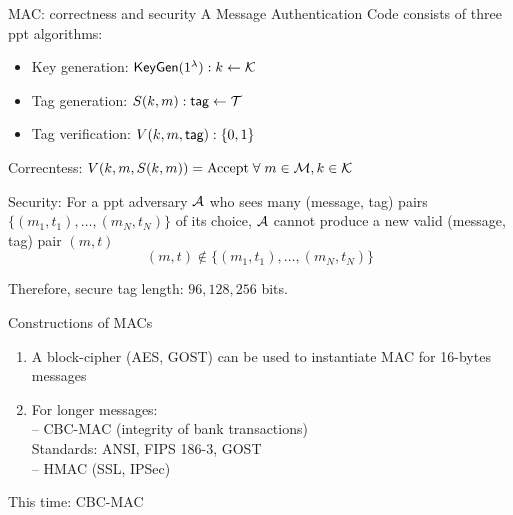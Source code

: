 \documentclass[usenames,dvipsnames, 9pt]{beamer}
\begin{document}
\begin{frame}{MAC: correctness and security}
\Large
A {\color{Orange} Message Authentication Code } consists of three ppt algorithms:
\vspace{-5pt}
\begin{itemize}
	\item Key generation: $\textsf{KeyGen}(1^\lambda): k \leftarrow \mathcal{K}$ \\[4pt]
	\item Tag generation: $S(k, m): \textsf{tag} \leftarrow \mathcal{T}$ \\[4pt]
	\item Tag verification: $V(k, m, \textsf{tag}): \{0, 1\}  $  \\
\end{itemize}

\pause
\vspace{10pt}
{\color{Orange}Correcntess:} \LARGE 
$ V(k, m, S(k,m)) = \text{Accept} \; \forall \; m \in \mathcal{M}, k \in \mathcal{K} $

\vspace{10pt}
{\color{Orange}Security:}
For a ppt adversary $\mathcal{A}$ who sees many (message, tag) pairs $\{(m_1, t_1), \ldots, (m_N, t_N) \}$ of its choice, $\mathcal{A}$ cannot produce a new valid (message, tag) pair $(m,t)$
\[(m,t) \notin \{(m_1, t_1), \ldots, (m_N, t_N) \}\]

\vspace{10pt}

Therefore, secure tag length: $96, 128, 256 $ bits.
\end{frame}

\begin{frame}{Constructions of MACs}
\Large
\begin{enumerate}
	\itemsep1em
	\item A block-cipher  (AES, GOST) can be used to instantiate MAC for 16-bytes messages
	\item For longer messages:  \\
		-- CBC-MAC (integrity of bank transactions) \\ 
		Standards: ANSI, FIPS 186-3, GOST \\[5pt]
		-- HMAC (SSL, IPSec)
\end{enumerate}
\pause
\centering
\LARGE
\vspace{15pt}
This time: CBC-MAC
\end{frame}
\end{document}
